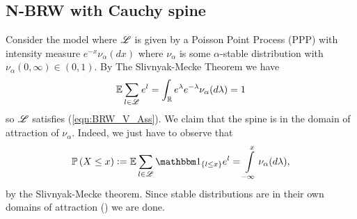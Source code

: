 






\subsection{N-BRW with Cauchy spine}
Consider the model where $\mathscr{L}$ is given by a Poisson Point Process (PPP) with intensity measure $e^{-x} \nu_\alpha (dx)$ where $\nu_\alpha$ is some $\alpha$-stable distribution with $\nu_\alpha(0, \infty) \in (0, 1)$. By The Slivnyak-Mecke Theorem \cite[Theorem 1.13]{baccelli2009stochastic} we have
\begin{equation}\nonumber
\mathbb{E} \sum\limits_{l \in \mathscr{L}} e^l = \int_{\mathbb{R}} e^\lambda e^{-\lambda} \nu_\alpha(d\lambda) = 1
\end{equation}
so $\mathscr{L}$ satisfies (\ref{eqn:BRW_V_Ass}). We claim that the spine is in the domain of attraction of $\nu_\alpha$. Indeed, we just have to observe that 
\begin{equation}\nonumber
\Pr{X \leq x} \defeq \E \sum\limits_{l \in \scr{L}} \Ind_{\{ l \leq x \}} e^l  = \int\limits^x_{-\infty} \nu_\alpha(d \lambda), 
\end{equation}
 by the Slivnyak-Mecke theorem. Since stable distributions are in their own domains of attraction (\cite[p. 576]{feller1957introduction}) we are done. 

